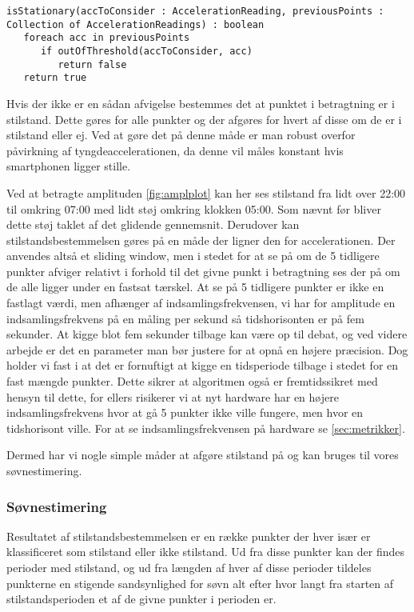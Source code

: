 \begin{lstlisting}[caption={Pseudo kode for at tjekke om et punkt er i stilstand.}, label={lst:pseudoStationary}]
isStationary(accToConsider : AccelerationReading, previousPoints : Collection of AccelerationReadings) : boolean
   foreach acc in previousPoints
      if outOfThreshold(accToConsider, acc)
         return false
   return true
\end{lstlisting}

Hvis der ikke er en sådan afvigelse bestemmes det at punktet i betragtning er i stilstand.
Dette gøres for alle punkter og der afgøres for hvert af disse om de er i stilstand eller ej.
Ved at gøre det på denne måde er man robust overfor påvirkning af tyngdeaccelerationen, da denne vil måles konstant hvis smartphonen ligger stille.

Ved at betragte amplituden \cref{fig:amplplot} kan her ses stilstand fra lidt over 22:00 til omkring 07:00 med lidt støj omkring klokken 05:00.
Som nævnt før bliver dette støj taklet af det glidende gennemsnit.
Derudover kan stilstandsbestemmelsen gøres på en måde der ligner den for accelerationen.
Der anvendes altså et sliding window, men i stedet for at se på om de 5 tidligere punkter afviger relativt i forhold til det givne punkt i betragtning ses der på om de alle ligger under en fastsat tærskel.
At se på 5 tidligere punkter er ikke en fastlagt værdi, men afhænger af indsamlingsfrekvensen, vi har for amplitude en indsamlingsfrekvens på en måling per sekund så tidshorisonten er på fem sekunder.
At kigge blot fem sekunder tilbage kan være op til debat, og ved videre arbejde er det en parameter man bør justere for at opnå en højere præcision.
Dog holder vi fast i at det er fornuftigt at kigge en tidsperiode tilbage i stedet for en fast mængde punkter.
Dette sikrer at algoritmen også er fremtidssikret med hensyn til dette, for ellers risikerer vi at nyt hardware har en højere indsamlingsfrekvens hvor at gå 5 punkter ikke ville fungere, men hvor en tidshorisont ville.
For at se indsamlingsfrekvensen på hardware se \cref{sec:metrikker}.

Dermed har vi nogle simple måder at afgøre stilstand på og kan bruges til vores søvnestimering.

\subsubsection{Søvnestimering}
Resultatet af stilstandsbestemmelsen er en række punkter der hver især er klassificeret som stilstand eller ikke stilstand.
Ud fra disse punkter kan der findes perioder med stilstand, og ud fra længden af hver af disse perioder tildeles punkterne en stigende sandsynlighed for søvn alt efter hvor langt fra starten af stilstandsperioden et af de givne punkter i perioden er.

